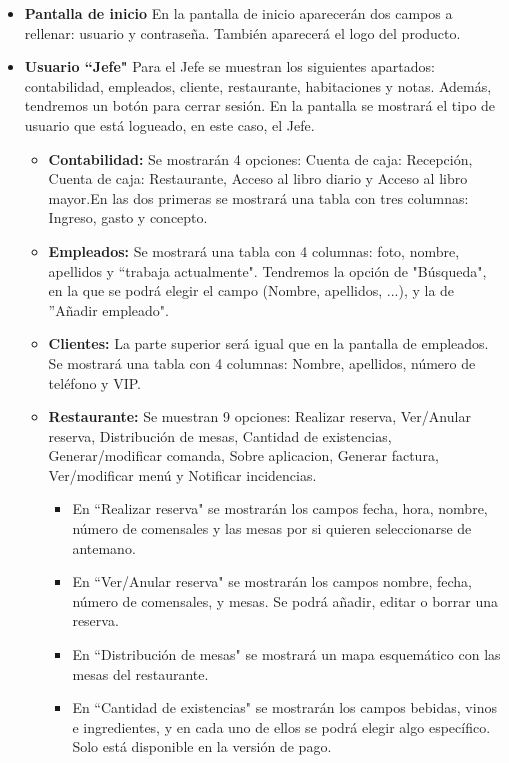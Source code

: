 \documentclass[spanish,a4paper,11pt, twoside]{report}	%
\begin{document}
			\begin{itemize}
				\item \textbf{Pantalla de inicio} En la pantalla de inicio aparecerán dos campos a rellenar: usuario y contraseña. También aparecerá el logo del producto.
				\item \textbf{Usuario “Jefe"} Para el Jefe se muestran los siguientes apartados: contabilidad, empleados, cliente, restaurante, habitaciones y notas. Además, tendremos un botón para cerrar sesión. En la pantalla se mostrará el tipo de usuario que está logueado, en este caso, el Jefe. 
				\begin{itemize}
					\item \textbf{Contabilidad: }Se mostrarán 4 opciones: Cuenta de caja: Recepción, Cuenta de caja: Restaurante, Acceso al libro diario y Acceso al libro mayor.En las dos primeras se mostrará una tabla con tres columnas: Ingreso, gasto y concepto.
					 \item \textbf{Empleados: }Se mostrará una tabla con 4 columnas: foto, nombre, apellidos y “trabaja actualmente". Tendremos la opción de "Búsqueda", en la que se podrá elegir el campo (Nombre, apellidos, ...), y la de ''Añadir empleado". 
					 \item \textbf{Clientes: }La parte superior será igual que en la pantalla de empleados. Se mostrará una tabla con 4 columnas: Nombre, apellidos, número de teléfono y VIP. 
					 \item \textbf{Restaurante: }Se muestran 9 opciones: Realizar reserva, Ver/Anular reserva, Distribución de mesas, Cantidad de existencias, Generar/modificar comanda, Sobre aplicacion, Generar factura, Ver/modificar menú y Notificar incidencias.
					\begin{itemize}
						\item En “Realizar reserva" se mostrarán los campos fecha, hora, nombre, número de comensales y las mesas por si quieren seleccionarse de antemano. 
						\item En “Ver/Anular reserva" se mostrarán  los campos  nombre, fecha, número de comensales, y mesas. Se podrá  añadir, editar o borrar una reserva.
						\item En “Distribución de mesas" se mostrará un mapa esquemático con las mesas del restaurante. 
						\item En “Cantidad de existencias" se mostrarán los campos bebidas, vinos e ingredientes, y en cada uno de ellos se podrá elegir algo específico. Solo está disponible en la versión de pago.

\end{itemize}
\end{itemize}
\end{itemize}
\end{document}
